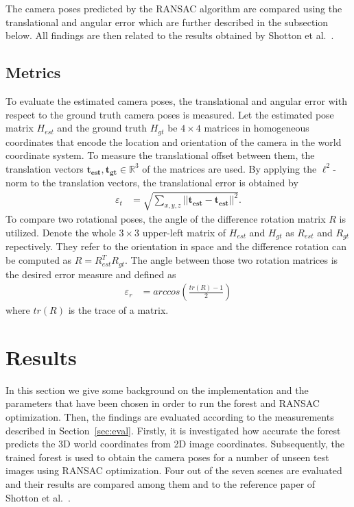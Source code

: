 \documentclass[final]{cvpr}
\begin{document}
The camera poses predicted by the RANSAC algorithm are compared using the translational and angular error 
which are further described in the subsection below. All findings are then related to the results obtained by 
Shotton et al.~\cite{shotton2013}. 


\subsection{Metrics} \label{subsec:metrics}
To evaluate the estimated camera poses, the translational and angular error with respect to the 
ground truth camera poses is measured. Let the estimated pose matrix $H_{est}$ and the ground truth 
$H_{gt}$ be $4 \times 4$ matrices
in homogeneous coordinates that encode the location and orientation of the camera in the world 
coordinate system. To measure the translational offset between them, the translation vectors 
$\boldsymbol{t_{est}}, \boldsymbol{t_{gt}} \in \mathbb{R}^3$ of the matrices are used.
By applying the $\ell^2$-norm to the translation vectors, the translational error is obtained by
\begin{align}
    \varepsilon_t &= \sqrt{\sum_{x,y,z}||\boldsymbol{t_{est}} - \boldsymbol{t_{est}}||^2}.
\end{align}
To compare two rotational poses, the angle of the difference rotation matrix $R$ is utilized. 
Denote the whole $3\times3$ upper-left matrix of $H_{est}$ and $H_{gt}$ as $R_{est}$ and 
$R_{gt}$ repectively. They refer to the orientation in space and the difference rotation can be computed 
as $R = R_{est}^TR_{gt}$. The angle between those two rotation matrices is the desired
error measure and defined as
\begin{align}
    \varepsilon_r &= arccos \left( \frac{tr(R)-1}{2} \right)
\end{align}
where $tr(R)$ is the trace of a matrix.


\section{Results}
In this section we give some background on the implementation and the parameters that have been chosen in order to 
run the forest and RANSAC optimization. Then, the findings are evaluated according to the measurements described
in Section~\ref{sec:eval}. Firstly, it is investigated how accurate the 
forest predicts the 3D world coordinates from 2D image coordinates. Subsequently, the trained forest is used to obtain 
the camera poses for a number of unseen test images using RANSAC optimization. Four out of the seven scenes 
are evaluated and their results are compared among them and to the reference paper of Shotton et al.~\cite{shotton2013}. 
\end{document}
